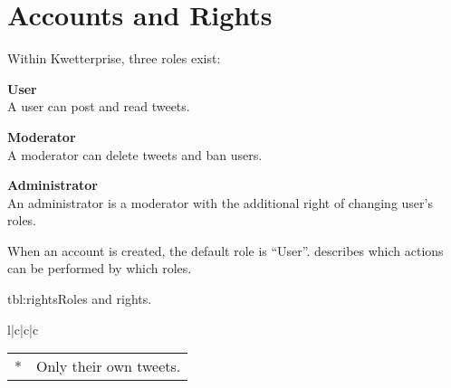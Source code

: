 \chapter{Accounts and Rights}
Within Kwetterprise, three roles exist:
\begin{teenumerate}
    \item \textbf{User}\\
    A user can post and read tweets.
    \item \textbf{Moderator}\\
    A moderator can delete tweets and ban users.
    \item \textbf{Administrator}\\
    An administrator is a moderator with the additional right of changing user's roles.
\end{teenumerate}

When an account is created, the default role is ``User''.  describes which actions can be performed by which roles.

\begin{tetable}{tbl:rights}{Roles and rights.}
    \begin{tetabular}{l|c|c|c}
    \end{tetabular}
\end{tetable}
{\footnotesize
\begin{tabular}{l@{}l}
    * & Only their own tweets.\\
\end{tabular}}